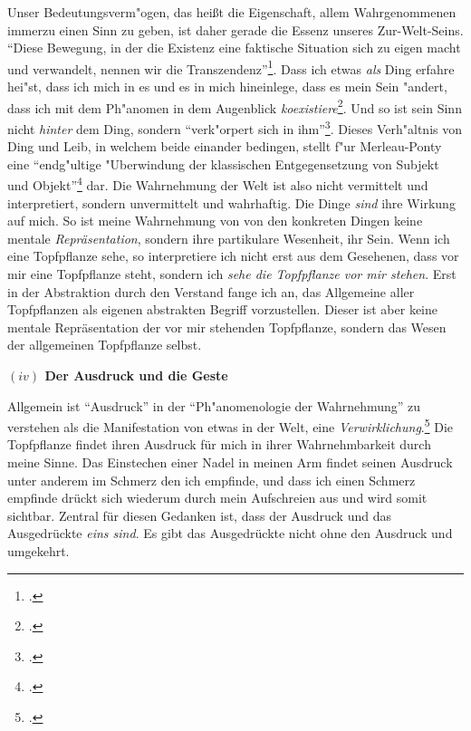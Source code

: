 \documentclass[a4paper, 12pt]{article}
\begin{document}
\begin{onehalfspace}
Unser Bedeutungsverm"ogen, das heißt die Eigenschaft, allem Wahrgenommenen immerzu einen Sinn zu geben, ist daher gerade die Essenz unseres Zur-Welt-Seins. "`Diese Bewegung, in der die Existenz eine faktische Situation sich zu eigen macht und verwandelt, nennen wir die Transzendenz"'\footnote{\Cite[Siehe][S. 202]{merleau1966phanomenologie}.}. Dass ich etwas \emph{als} Ding erfahre hei"st, dass ich mich in es und es in mich hineinlege, dass es mein Sein "andert, dass ich mit dem Ph"anomen in dem Augenblick \emph{koexistiere}\footnote{\Cite[Vgl.][S. 368]{merleau1966phanomenologie}.}. Und so ist sein Sinn nicht \emph{hinter} dem Ding, sondern "`verk"orpert sich in ihm"'\footnote{\Cite[Siehe][S. 370]{merleau1966phanomenologie}.}. Dieses Verh"altnis von Ding und Leib, in welchem beide einander bedingen, stellt f"ur Merleau-Ponty eine "`endg"ultige "Uberwindung der klassischen Entgegensetzung von Subjekt und Objekt"'\footnote{\Cite[Siehe][S. 207]{merleau1966phanomenologie}.} dar. Die Wahrnehmung der Welt ist also nicht vermittelt und interpretiert, sondern unvermittelt und wahrhaftig. Die Dinge \emph{sind} ihre Wirkung auf mich. So ist meine Wahrnehmung von von den konkreten Dingen keine mentale \emph{Repräsentation}, sondern ihre partikulare Wesenheit, ihr Sein. Wenn ich eine Topfpflanze sehe, so interpretiere ich nicht erst aus dem Gesehenen, dass vor mir eine Topfpflanze steht, sondern ich \emph{sehe die Topfpflanze vor mir stehen}. Erst in der Abstraktion durch den Verstand fange ich an, das Allgemeine aller Topfpflanzen als eigenen abstrakten Begriff vorzustellen. Dieser ist aber keine mentale Repräsentation der vor mir stehenden Topfpflanze, sondern das Wesen der allgemeinen Topfpflanze selbst.

\vspace{5mm}

\noindent\textbf{$(iv)$ Der Ausdruck und die Geste}

\noindent Allgemein ist "`Ausdruck"' in der "`Ph"anomenologie der Wahrnehmung"' zu verstehen als die Manifestation von etwas in der Welt, eine \emph{Verwirklichung}.\footnote{\Cite[Vgl.][S. 217]{merleau1966phanomenologie}.} Die Topfpflanze findet ihren Ausdruck für mich in ihrer Wahrnehmbarkeit durch meine Sinne. Das Einstechen einer Nadel in meinen Arm findet seinen Ausdruck unter anderem im Schmerz den ich empfinde, und dass ich einen Schmerz empfinde drückt sich wiederum durch mein Aufschreien aus und wird somit sichtbar. Zentral für diesen Gedanken ist, dass der Ausdruck und das Ausgedrückte \emph{eins sind}. Es gibt das Ausgedrückte nicht ohne den Ausdruck und umgekehrt. 


\end{onehalfspace}
\end{document}

